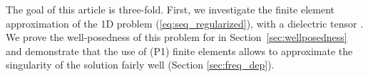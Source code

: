 { %
 





The goal of this article is three-fold. 
First, we investigate the finite element approximation of the 1D 
problem (\ref{eq:seq_regularized}), with a dielectric tensor . 
We prove the well-posedness of this problem for  in Section~\ref{sec:wellposedness} and 
demonstrate that the use of  (P1) finite elements allows to approximate the singularity 
of the solution fairly well (Section \ref{sec:freq_dep}). 
}

